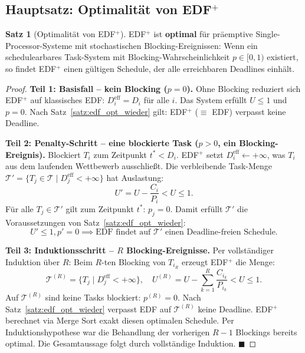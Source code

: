 ﻿\documentclass[a4paper,12pt]{report}
\theoremstyle{definition}
\newtheorem{satz}{Satz}[chapter]
\begin{document}
\subsection{Hauptsatz: Optimalität von EDF$^+$}

\begin{satz}[Optimalität von EDF$^+$]
	\label{satz:edfplus_optimal}
	EDF$^+$ ist \textbf{optimal} für präemptive Single-Processor-Systeme mit
	stochastischen Blocking-Ereignissen: Wenn ein schedulearbares Task-System mit
	Blocking-Wahrscheinlichkeit $p \in [0,1)$ existiert, so findet EDF$^+$ einen
	gültigen Schedule, der alle erreichbaren Deadlines einhält.
\end{satz}

\begin{proof}
	\textbf{Teil 1: Basisfall -- kein Blocking ($p = 0$).}
	Ohne Blocking reduziert sich EDF$^+$ auf klassisches EDF:
	$D_i^{\text{eff}} = D_i$ für alle $i$. Das System erfüllt $U \leq 1$ und $p = 0$.
	Nach Satz~\ref{satz:edf_opt_wieder} gilt: EDF$^+$ ($\equiv$ EDF) verpasst keine Deadline.

	\medskip
	\textbf{Teil 2: Penalty-Schritt -- eine blockierte Task ($p > 0$, ein Blocking-Ereignis).}
	Blockiert $T_i$ zum Zeitpunkt $t^* < D_i$. EDF$^+$ setzt
	$D_i^{\text{eff}} \leftarrow +\infty$, was $T_i$ aus dem laufenden Wettbewerb
	ausschließt. Die verbleibende Task-Menge
	$\mathcal{T}' = \{T_j \in \mathcal{T} \mid D_j^{\text{eff}} < +\infty\}$
	hat Auslastung:
	\[
		U' = U - \frac{C_i}{P_i} < U \leq 1.
	\]
	Für alle $T_j \in \mathcal{T}'$ gilt zum Zeitpunkt $t^*$: $p_j = 0$.
	Damit erfüllt $\mathcal{T}'$ die Voraussetzungen von Satz~\ref{satz:edf_opt_wieder}:
	\[
		U' \leq 1, p' = 0 \implies \text{EDF findet auf } \mathcal{T}' \text{ einen Deadline-freien Schedule.}
	\]

	\medskip
	\textbf{Teil 3: Induktionsschritt -- $R$ Blocking-Ereignisse.}
	Per vollständiger Induktion über $R$: Beim $R$-ten Blocking von $T_{i_R}$
	erzeugt EDF$^+$ die Menge:
	\[
		\mathcal{T}^{(R)} = \bigl\{T_j \mid D_j^{\text{eff}} < +\infty\bigr\}, \quad
		U^{(R)} = U - \sum_{k=1}^{R} \frac{C_{i_k}}{P_{i_k}} < U \leq 1.
	\]
	Auf $\mathcal{T}^{(R)}$ sind keine Tasks blockiert: $p^{(R)} = 0$. Nach
	Satz~\ref{satz:edf_opt_wieder} verpasst EDF auf $\mathcal{T}^{(R)}$ keine Deadline.
	EDF$^+$ berechnet via Merge Sort exakt diesen optimalen Schedule. Per
	Induktionshypothese war die Behandlung der vorherigen $R-1$ Blockings bereits
	optimal. Die Gesamtaussage folgt durch vollständige Induktion. \hfill$\blacksquare$
\end{proof}
\end{document}
